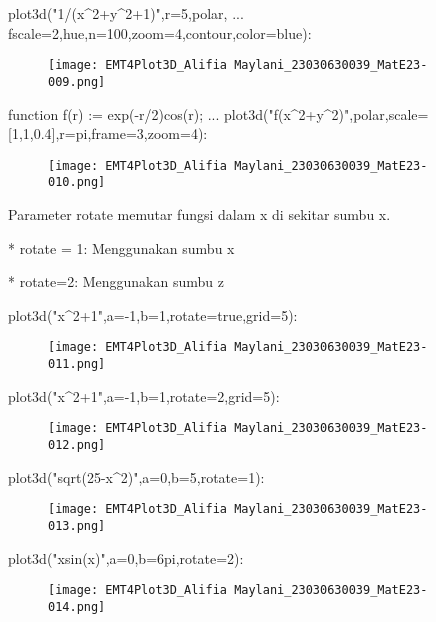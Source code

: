 \documentclass{article}
\begin{document}
\>plot3d("1/(x^2+y^2+1)",r=5,\>polar, ...  
\>   fscale=2,\>hue,n=100,zoom=4,\>contour,color=blue):


\begin{figure}
    \centering
    \texttt{[image: EMT4Plot3D\_Alifia Maylani\_23030630039\_MatE23-009.png]}
    \caption{}
    \label{fig:enter-label}
\end{figure}

\>function f(r) := exp(-r/2)\*cos(r); ...  
\>   plot3d("f(x^2+y^2)",\>polar,scale=[1,1,0.4],r=pi,frame=3,zoom=4):


\begin{figure}
    \centering
    \texttt{[image: EMT4Plot3D\_Alifia Maylani\_23030630039\_MatE23-010.png]}
    \caption{}
    \label{fig:enter-label}
\end{figure}

Parameter rotate memutar fungsi dalam x di sekitar sumbu x.


* 
rotate = 1: Menggunakan sumbu x

* 
rotate=2: Menggunakan sumbu z


\>plot3d("x^2+1",a=-1,b=1,rotate=true,grid=5):


\begin{figure}
    \centering
    \texttt{[image: EMT4Plot3D\_Alifia Maylani\_23030630039\_MatE23-011.png]}
    \caption{}
    \label{fig:enter-label}
\end{figure}

\>plot3d("x^2+1",a=-1,b=1,rotate=2,grid=5):


\begin{figure}
    \centering
    \texttt{[image: EMT4Plot3D\_Alifia Maylani\_23030630039\_MatE23-012.png]}
    \caption{}
    \label{fig:enter-label}
\end{figure}

\>plot3d("sqrt(25-x^2)",a=0,b=5,rotate=1):


\begin{figure}
    \centering
    \texttt{[image: EMT4Plot3D\_Alifia Maylani\_23030630039\_MatE23-013.png]}
    \caption{}
    \label{fig:enter-label}
\end{figure}

\>plot3d("x\*sin(x)",a=0,b=6pi,rotate=2):


\begin{figure}
    \centering
    \texttt{[image: EMT4Plot3D\_Alifia Maylani\_23030630039\_MatE23-014.png]}
    \caption{}
    \label{fig:enter-label}
\end{figure}
\end{document}
